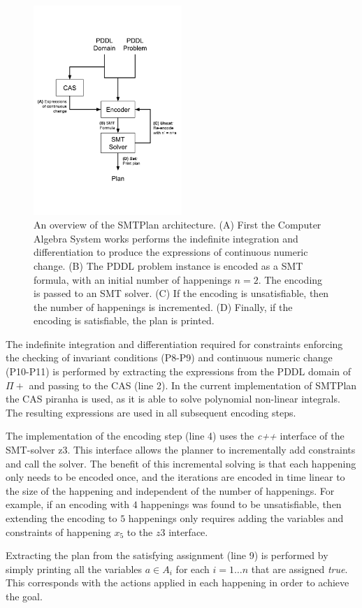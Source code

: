 \begin{figure}[ht]
\centering
\includegraphics[width=0.50\textwidth]{diagrams/architecture.pdf}
\caption{An overview of the SMTPlan architecture. (A) First the Computer Algebra System works performs the indefinite integration and differentiation to produce the expressions of continuous numeric change. (B) The PDDL problem instance is encoded as a SMT formula, with an initial number of happenings $n=2$. The encoding is passed to an SMT solver. (C) If the encoding is unsatisfiable, then the number of happenings is incremented. (D) Finally, if the encoding is satisfiable, the plan is printed. }
\label{fig:SMTPlan}
\end{figure}

The indefinite integration and differentiation required for constraints enforcing the checking of invariant conditions (P8-P9) and continuous numeric change (P10-P11) is performed by extracting the expressions from the PDDL domain of $\Pi+$ and passing to the CAS (line 2). In the current implementation of SMTPlan the CAS piranha is used, as it is able to solve polynomial non-linear integrals. The resulting expressions are used in all subsequent encoding steps.

The implementation of the encoding step (line 4) uses the \textit{c++} interface of the SMT-solver z3. This interface allows the planner to incrementally add constraints and call the solver. The benefit of this incremental solving is that each happening only needs to be encoded once, and the iterations are encoded in time linear to the size of the happening and independent of the number of happenings. For example, if an encoding with $4$ happenings was found to be unsatisfiable, then extending the encoding to $5$ happenings only requires adding the variables and constraints of happening $x_5$ to the $z3$ interface.

Extracting the plan from the satisfying assignment (line 9) is performed by simply printing all the variables $a\in A_i$ for each $i=1\ldots n$ that are assigned \textit{true}. This corresponds with the actions applied in each happening in order to achieve the goal.

